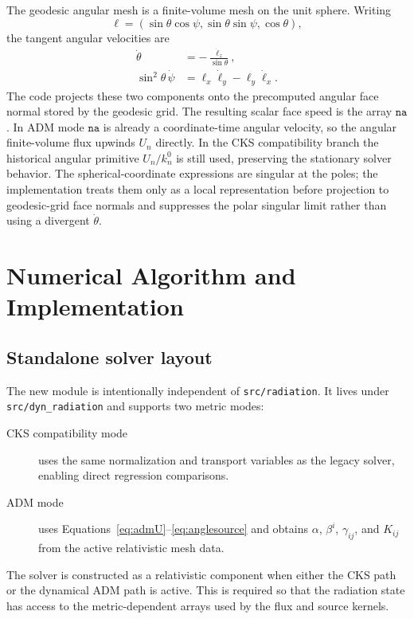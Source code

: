 \documentclass[11pt]{article}
\newcommand{\code}[1]{\texttt{#1}}
\begin{document}
The geodesic angular mesh is a finite-volume mesh on the unit sphere.  Writing
\[
  \ell=(\sin\theta\cos\psi,\sin\theta\sin\psi,\cos\theta),
\]
the tangent angular velocities are
\begin{align}
  \dot\theta &=-\frac{\dot\ell_z}{\sin\theta},\\
  \sin^2\theta\,\dot\psi
    &=\ell_x\dot\ell_y-\ell_y\dot\ell_x .
  \label{eq:theta_psi_dot}
\end{align}
The code projects these two components onto the precomputed angular face
normal stored by the geodesic grid.  The resulting scalar face speed is the
array \(\code{na}\).  In ADM mode \(\code{na}\) is already a coordinate-time
angular velocity, so the angular finite-volume flux upwinds \(U_n\) directly.
In the CKS compatibility branch the historical angular primitive \(U_n/k^0_n\)
is still used, preserving the stationary solver behavior.
The spherical-coordinate expressions are singular at the poles; the
implementation treats them only as a local representation before projection to
geodesic-grid face normals and suppresses the polar singular limit rather than
using a divergent \(\dot\theta\).

\section{Numerical Algorithm and Implementation}
\label{sec:alg}

\subsection{Standalone solver layout}

The new module is intentionally independent of \code{src/radiation}.  It lives
under \code{src/dyn\_radiation} and supports two metric modes:
\begin{description}
  \item[CKS compatibility mode] uses the same normalization and transport
    variables as the legacy solver, enabling direct regression comparisons.
  \item[ADM mode] uses Equations~\eqref{eq:admU}--\eqref{eq:anglesource} and
    obtains \(\alpha\), \(\beta^i\), \(\gamma_{ij}\), and \(K_{ij}\) from the
    active relativistic mesh data.
\end{description}
The solver is constructed as a relativistic component when either the CKS path
or the dynamical ADM path is active.  This is required so that the radiation
state has access to the metric-dependent arrays used by the flux and source
kernels.
\end{document}
